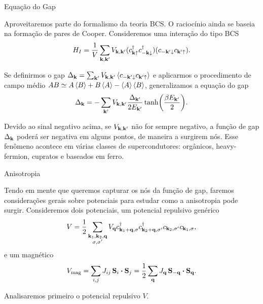 \documentclass[8pt,aspectratio=169,xcolor={table,dvipsnames,usenames}]{beamer}
\begin{document}


\begin{frame}{Equação do Gap}

Aproveitaremos parte do formalismo da teoria BCS. O raciocínio ainda se baseia na formação de pares de Cooper. Consideremos uma interação do tipo BCS
$$
H_I =
\frac{1}{V} \sum_{\vb{k},\vb{k}'} V_{\vb{k},\vb{k}'} (c_{\vb{k}\uparrow}^\dagger c_{-\vb{k}\downarrow}^\dagger) (c_{-\vb{k}'\downarrow} c_{\vb{k}'\uparrow}).
$$

Se definirmos o gap $\Delta_{\k} = \sum_{\k'} V_{\k,\k'} \ev{c_{-\k'\down} c_{\k'\up}}$ e aplicarmos o procedimento de campo médio $AB \simeq A\ev{B} + B\ev{A} - \ev{A}\ev{B}$, generalizamos a equação do gap
\begin{equation} \label{eq:gapeq}
\Delta_{\vb{k}} = - \sum_{\vb{k}'} V_{\vb{k},\vb{k}'} \frac{\Delta_{\vb{k}'}}{2 E_{\vb{k}'}} \tanh(\frac{\beta E_{\vb{k}'}}{2}).
\end{equation}

Devido ao sinal negativo acima, se $V_{\vb{k},\vb{k}'}$ não for sempre negativo, a função de gap $\Delta_{\vb{k}}$ poderá ser negativa em alguns pontos, de maneira a surgirem nós. Esse fenômeno acontece em várias classes de supercondutores: orgânicos, heavy-fermion, cupratos e baseados em ferro.

\end{frame}



\begin{frame}{Anisotropia}

Tendo em mente que queremos capturar os nós da função de gap, faremos considerações gerais sobre potenciais para estudar como a anisotropia pode surgir. Consideremos dois potenciais, um potencial repulsivo genérico
$$
V = \frac{1}{2} \sum_{\substack{\vb{k}_1,\vb{k}_2,\vb{q} \\ \sigma, \sigma'}} V_{\vb{q}} c_{\vb{k}_1+\vb{q},\sigma}^\dagger c_{\vb{k}_2+\vb{q},\sigma'}^\dagger c_{\vb{k}_2,\sigma'} c_{\vb{k}_1,\sigma},
$$
e um magnético
$$
V_{\text{mag}} = \sum_{i,j} J_{ij} \, \vb{S}_i \vdot \vb{S}_j = \frac{1}{2} \sum_{\q} J_{\q} \, \vb{S}_{-\q} \vdot \vb{S}_{\q}.
$$

\n

Analisaremos primeiro o potencial repulsivo $V$.

\end{frame}

\end{document}
